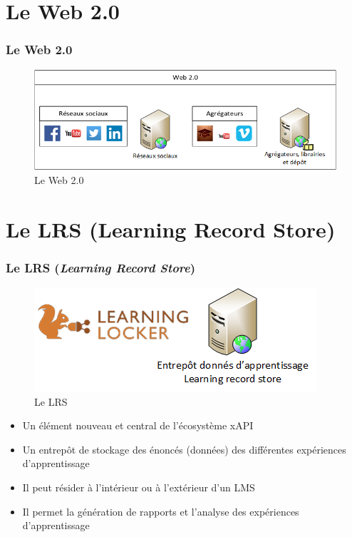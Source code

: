 \section{Le Web 2.0} 
\begin{frame}
\frametitle{Le Web 2.0}
\begin{figure}
\includegraphics[scale=0.6]{web2.png}
\caption{Le Web 2.0}
\end{figure}
\end{frame}
\section{Le LRS (Learning Record Store)} 
\begin{frame}[allowframebreaks]
\frametitle{Le LRS (\textit{Learning Record Store})\citep{traore_learning_2015}}
\begin{figure}
\includegraphics[scale=0.75]{lrs.png}
\caption{Le LRS}
\end{figure}
\framebreak
\begin{itemize} 
\item Un élément nouveau et central de l'écosystème xAPI
\item Un entrepôt de stockage des énoncés (données) des différentes expériences d'apprentissage
\item Il peut résider à l'intérieur ou à l'extérieur d'un LMS
\item Il permet la génération de rapports et l'analyse des expériences d'apprentissage
\end{itemize} 
\end{frame}





